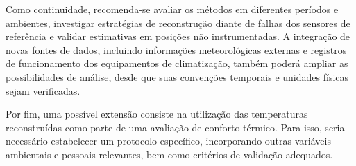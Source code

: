 Como continuidade, recomenda-se avaliar os métodos em
diferentes períodos e ambientes, investigar estratégias
de reconstrução diante de falhas dos sensores de referência
e validar estimativas em posições não instrumentadas.
A integração de novas fontes de dados, incluindo informações
meteorológicas externas e registros de funcionamento dos
equipamentos de climatização, também poderá ampliar as
possibilidades de análise, desde que suas convenções
temporais e unidades físicas sejam verificadas.

Por fim, uma possível extensão consiste na utilização
das temperaturas reconstruídas como parte de uma avaliação
de conforto térmico. Para isso, seria necessário estabelecer
um protocolo específico, incorporando outras variáveis
ambientais e pessoais relevantes, bem como critérios
de validação adequados.
